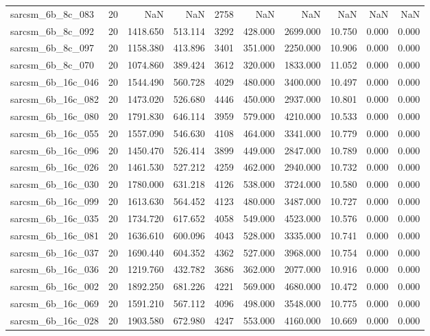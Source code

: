 \begin{tabular}{lrrrrrrrrr}
sarcsm\_6b\_8c\_083 & 20 & NaN & NaN & 2758 & NaN & NaN & NaN & NaN & NaN \\
sarcsm\_6b\_8c\_092 & 20 & 1418.650 & 513.114 & 3292 & 428.000 & 2699.000 & 10.750 & 0.000 & 0.000 \\
sarcsm\_6b\_8c\_097 & 20 & 1158.380 & 413.896 & 3401 & 351.000 & 2250.000 & 10.906 & 0.000 & 0.000 \\
sarcsm\_6b\_8c\_070 & 20 & 1074.860 & 389.424 & 3612 & 320.000 & 1833.000 & 11.052 & 0.000 & 0.000 \\
sarcsm\_6b\_16c\_046 & 20 & 1544.490 & 560.728 & 4029 & 480.000 & 3400.000 & 10.497 & 0.000 & 0.000 \\
sarcsm\_6b\_16c\_082 & 20 & 1473.020 & 526.680 & 4446 & 450.000 & 2937.000 & 10.801 & 0.000 & 0.000 \\
sarcsm\_6b\_16c\_080 & 20 & 1791.830 & 646.114 & 3959 & 579.000 & 4210.000 & 10.533 & 0.000 & 0.000 \\
sarcsm\_6b\_16c\_055 & 20 & 1557.090 & 546.630 & 4108 & 464.000 & 3341.000 & 10.779 & 0.000 & 0.000 \\
sarcsm\_6b\_16c\_096 & 20 & 1450.470 & 526.414 & 3899 & 449.000 & 2847.000 & 10.789 & 0.000 & 0.000 \\
sarcsm\_6b\_16c\_026 & 20 & 1461.530 & 527.212 & 4259 & 462.000 & 2940.000 & 10.732 & 0.000 & 0.000 \\
sarcsm\_6b\_16c\_030 & 20 & 1780.000 & 631.218 & 4126 & 538.000 & 3724.000 & 10.580 & 0.000 & 0.000 \\
sarcsm\_6b\_16c\_099 & 20 & 1613.630 & 564.452 & 4123 & 480.000 & 3487.000 & 10.727 & 0.000 & 0.000 \\
sarcsm\_6b\_16c\_035 & 20 & 1734.720 & 617.652 & 4058 & 549.000 & 4523.000 & 10.576 & 0.000 & 0.000 \\
sarcsm\_6b\_16c\_081 & 20 & 1636.610 & 600.096 & 4043 & 528.000 & 3335.000 & 10.741 & 0.000 & 0.000 \\
sarcsm\_6b\_16c\_037 & 20 & 1690.440 & 604.352 & 4362 & 527.000 & 3968.000 & 10.754 & 0.000 & 0.000 \\
sarcsm\_6b\_16c\_036 & 20 & 1219.760 & 432.782 & 3686 & 362.000 & 2077.000 & 10.916 & 0.000 & 0.000 \\
sarcsm\_6b\_16c\_002 & 20 & 1892.250 & 681.226 & 4221 & 569.000 & 4680.000 & 10.472 & 0.000 & 0.000 \\
sarcsm\_6b\_16c\_069 & 20 & 1591.210 & 567.112 & 4096 & 498.000 & 3548.000 & 10.775 & 0.000 & 0.000 \\
sarcsm\_6b\_16c\_028 & 20 & 1903.580 & 672.980 & 4247 & 553.000 & 4160.000 & 10.669 & 0.000 & 0.000 \\

\end{tabular}
